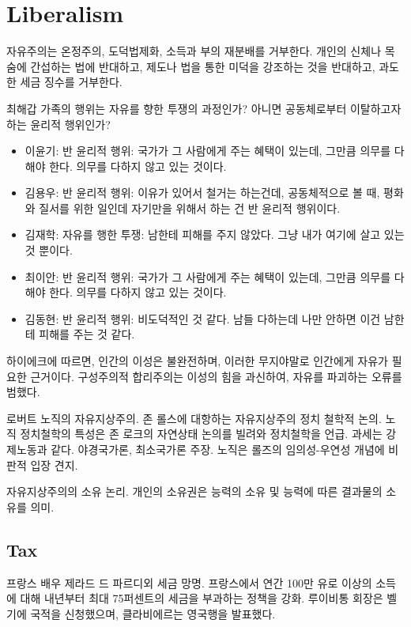 \section{Liberalism}

자유주의는 온정주의, 도덕법제화, 소득과 부의 재분배를 거부한다. 개인의 신체나 목숨에 간섭하는 법에
반대하고, 제도나 법을 통한 미덕을 강조하는 것을 반대하고, 과도한 세금 징수를 거부한다.

최해갑 가족의 행위는 자유를 향한 투쟁의 과정인가? 아니면 공동체로부터 이탈하고자 하는 윤리적 행위인가?
\begin{itemize}
  \item 이윤기: 반 윤리적 행위: 국가가 그 사람에게 주는 혜택이 있는데, 그만큼
        의무를 다해야 한다. 의무를 다하지 않고 있는 것이다.
  \item 김용우: 반 윤리적 행위: 이유가 있어서 철거는 하는건데, 공동체적으로 볼
        때, 평화와 질서를 위한 일인데 자기만을 위해서 하는 건 반 윤리적 행위이다.
  \item  김재학: 자유를 행한 투쟁: 남한테 피해를 주지 않았다. 그냥 내가 여기에
        살고 있는 것 뿐이다.
  \item 최이안: 반 윤리적 행위: 국가가 그 사람에게 주는 혜택이 있는데, 그만큼
        의무를 다해야 한다. 의무를 다하지 않고 있는 것이다.
  \item 김동현: 반 윤리적 행위: 비도덕적인 것 같다. 남들 다하는데 나만 안하면
        이건 남한테 피해를 주는 것 같다.
\end{itemize}

하이에크에 따르면, 인간의 이성은 불완전하며, 이러한 무지야말로 인간에게 자유가
필요한 근거이다. 구성주의적 합리주의는 이성의 힘을 과신하여, 자유를 파괴하는
오류를 범했다.

로버트 노직의 자유지상주의. 존 롤스에 대항하는 자유지상주의 정치 철학적 논의. 노직 정치철학의 특성은
존 로크의 자연상태 논의를 빌려와 정치철학을 언급. 과세는 강제노동과 같다. 야경국가론, 최소국가론 주장.
노직은 롤즈의 임의성-우연성 개념에 비판적 입장 견지.

자유지상주의의 소유 논리. 개인의 소유권은 능력의 소유 및 능력에 따른 결과물의 소유를 의미.

\subsection{Tax}

프랑스 배우 제라드 드 파르디외 세금 망명. 프랑스에서 연간 100만 유로 이상의
소득에 대해 내년부터 최대 75퍼센트의 세금을 부과하는 정책을 강화. 루이비통
회장은 벨기에 국적을 신청했으며, 클라비에르는 영국행을 발표했다.

